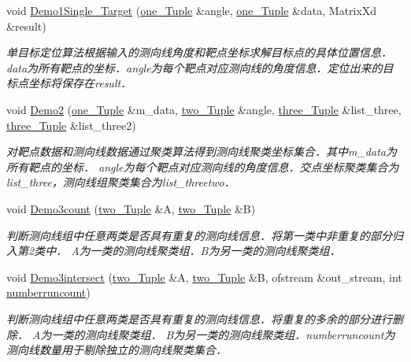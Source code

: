 \begin{DoxyCompactItemize}
void \hyperlink{multiloc_8txt_a591038f887e2771f356a8d321d275e8f}{Demo1\+Single\+\_\+\+Target} (\hyperlink{multiloc_8txt_a490e31016ad1c0d99b23e323d64e3aac}{one\+\_\+\+Tuple} \&angle, \hyperlink{multiloc_8txt_a490e31016ad1c0d99b23e323d64e3aac}{one\+\_\+\+Tuple} \&data, Matrix\+Xd \&result)
\begin{DoxyCompactList}\small\item\em 单目标定位算法根据输入的测向线角度和靶点坐标求解目标点的具体位置信息． data为所有靶点的坐标．angle为每个靶点对应测向线的角度信息．定位出来的目标点坐标将保存在result． \end{DoxyCompactList}\item 
void \hyperlink{multiloc_8txt_abb823a8ca84af45064f5b96a73c74fe8}{Demo2} (\hyperlink{multiloc_8txt_a490e31016ad1c0d99b23e323d64e3aac}{one\+\_\+\+Tuple} \&m\+\_\+data, \hyperlink{multiloc_8txt_a2e41d128befae015727cbf20484696a9}{two\+\_\+\+Tuple} \&angle, \hyperlink{multiloc_8txt_aa614d5a3aa93583e717bf9a9c9b6627b}{three\+\_\+\+Tuple} \&list\+\_\+three, \hyperlink{multiloc_8txt_aa614d5a3aa93583e717bf9a9c9b6627b}{three\+\_\+\+Tuple} \&list\+\_\+three2)
\begin{DoxyCompactList}\small\item\em 对靶点数据和测向线数据通过聚类算法得到测向线聚类坐标集合．其中m\+\_\+data为所有靶点的坐标． angle为每个靶点对应测向线的角度信息．交点坐标聚类集合为list\+\_\+three，测向线组聚类集合为list\+\_\+threetwo． \end{DoxyCompactList}\item 
void \hyperlink{multiloc_8txt_a36e038bc8d1780469e09f90327d2a16a}{Demo3count} (\hyperlink{multiloc_8txt_a2e41d128befae015727cbf20484696a9}{two\+\_\+\+Tuple} \&A, \hyperlink{multiloc_8txt_a2e41d128befae015727cbf20484696a9}{two\+\_\+\+Tuple} \&B)
\begin{DoxyCompactList}\small\item\em 判断测向线组中任意两类是否具有重复的测向线信息．将第一类中非重复的部分归入第2类中． A为一类的测向线聚类组．\+B为另一类的测向线聚类组． \end{DoxyCompactList}\item 
void \hyperlink{multiloc_8txt_a32e0cd9663c4b75f9bc607e7275dc41d}{Demo3intersect} (\hyperlink{multiloc_8txt_a2e41d128befae015727cbf20484696a9}{two\+\_\+\+Tuple} \&A, \hyperlink{multiloc_8txt_a2e41d128befae015727cbf20484696a9}{two\+\_\+\+Tuple} \&B, ofstream \&out\+\_\+stream, int \hyperlink{multiloc_8txt_a40bd71ae5bbd0f6944663390e9df5286}{numberruncount})
\begin{DoxyCompactList}\small\item\em 判断测向线组中任意两类是否具有重复的测向线信息．将重复的多余的部分进行删除． A为一类的测向线聚类组． B为另一类的测向线聚类组．numberruncount为测向线数量用于剔除独立的测向线聚类集合． \end{DoxyCompactList}\item 

\end{DoxyCompactItemize}
